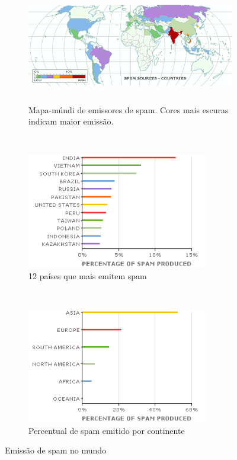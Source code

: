 \documentclass[a4paper,dvipdfm]{article}
\begin{document}
	\begin{figure}[ht]
		\begin{subfigure}[b]{\textwidth}
			\centering
			\includegraphics[height=5cm]{Imagens/m86security/spam-country-map.png}
			\caption{Mapa-múndi de emissores de spam. Cores mais escuras indicam maior emissão.}
		\end{subfigure}
		~
		\begin{subfigure}[b]{0.47\textwidth}
			\centering
			\includegraphics[height=5cm]{Imagens/m86security/spam-country-bar.png}
			\caption{12 países que mais emitem spam}
		\end{subfigure}
		~
		\begin{subfigure}[b]{0.47\textwidth}
			\centering
			\includegraphics[height=5cm]{Imagens/m86security/spam-continent-bar.png}
			\caption{Percentual de spam emitido por continente}
		\end{subfigure}
		\caption{Emissão de spam no mundo}
		\label{fig:spamworld}
	\end{figure}
		~
\end{document}
